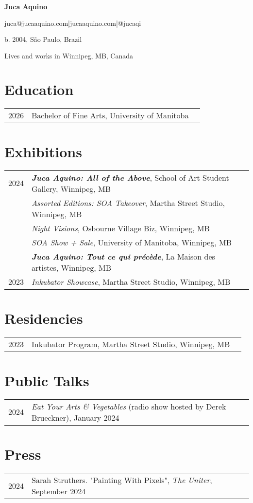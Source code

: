 \documentclass[12pt]{article}
\begin{document}
\begin{flushleft}

{\huge\bfseries Juca Aquino}

juca@jucaaquino.com\quad |\quad jucaaquino.com\quad |\quad @jucaqi

b. 2004, São Paulo, Brazil

Lives and works in Winnipeg, MB, Canada
\section{Education}
\begin{tabular}{@{}lll}
2026 & Bachelor of Fine Arts, University of Manitoba 
\end{tabular}
\section{Exhibitions}
\begin{tabular}{@{}lll}
    2024 & {\textbf{\itshape Juca Aquino: All of the Above}}, School of Art Student Gallery, Winnipeg, MB \\
     & {\itshape Assorted Editions: SOA Takeover}, Martha Street Studio, Winnipeg, MB \\
     & {\itshape Night Visions}, Osbourne Village Biz, Winnipeg, MB \\
     & {\itshape SOA Show + Sale}, University of Manitoba, Winnipeg, MB \\
     & {\textbf{\itshape Juca Aquino: Tout ce qui précède}}, La Maison des artistes, Winnipeg, MB \\
2023 & {\itshape Inkubator Showcase}, Martha Street Studio, Winnipeg, MB
\end{tabular}
\section{Residencies}
\begin{tabular}{@{}lll}
2023 & Inkubator Program, Martha Street Studio, Winnipeg, MB
\end{tabular}
\section{Public Talks}
\begin{tabular}{@{}lll}
    2024 & {\itshape Eat Your Arts \& Vegetables} (radio show hosted by Derek Brueckner), January 2024
\end{tabular}
\section{Press}
\begin{tabular}{@{}lll}
2024 & Sarah Struthers. "Painting With Pixels", {\itshape The Uniter}, September 2024
\end{tabular}

\end{flushleft}
\end{document}
